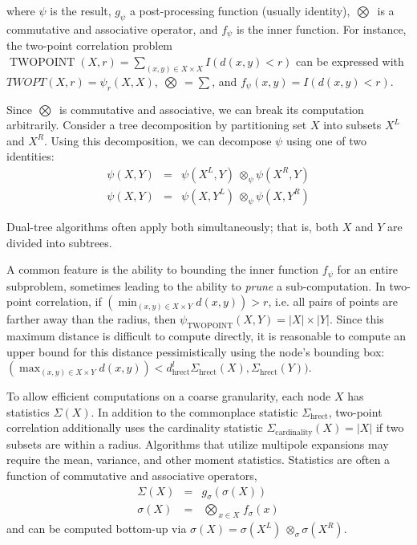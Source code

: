 \documentclass[times, leqno,twocolumn]{article}
\DeclareMathOperator{\TWOPT}{TWOPOINT}
\newcommand{\kdleft}[1]{#1^{\!L}}
\newcommand{\kdright}[1]{#1^{\!R}}
\newcommand{\lo}[1]{#1^{l}}
\newcommand{\distlo}[1]{\lo{d_{\text{hrect}}}}
\newcommand{\myOp}[1]{\mathop{\bigotimes\nolimits\!\!_{#1}}}
\newcommand{\myop}[1]{{\scriptstyle\:}\otimes_{\!#1}}
\newcommand{\letterglob}{\psi}
\newcommand{\inglob}{\psi}
\newcommand{\Opglob}{\myOp{\letterglob}}
\newcommand{\opglob}{\myop{\letterglob}}
\newcommand{\fglob}{f_{\letterglob}}
\newcommand{\gglob}{g_{\letterglob}}
\newcommand{\namestat}[1]{\Sigma_{\text{#1}}}
\newcommand{\outstat}{\Sigma}
\newcommand{\instat}{\sigma}
\newcommand{\Opstat}{\myOp{\instat}}
\newcommand{\opstat}{\myop{\instat}}
\newcommand{\fstat}{f_{\instat}}
\newcommand{\gstat}{g_{\instat}}
\begin{document}
\noindent where $\inglob$ is the result, $\gglob$ a post-processing function (usually identity), $\Opglob$ is a commutative and associative operator, and $\fglob$ is the inner function.
For instance, the two-point correlation problem $\TWOPT(X, r) = \sum_{(x, y) \in X \times X} I(d(x, y) < r)$ can be expressed with $TWOPT(X, r) = \inglob_r(X, X)$, $\Opglob = \sum$, and $\fglob(x, y) = I(d(x, y) < r)$.

Since $\Opglob$ is commutative and associative, we can break its computation arbitrarily.
Consider a tree decomposition by partitioning set $X$ into subsets $\kdleft{X}$ and $\kdright{X}$.
Using this decomposition, we can decompose $\inglob$ using one of two identities:
\begin{eqnarray}
\inglob(X, Y) &=& \inglob(\kdleft{X}, Y) \opglob \inglob(\kdright{X}, Y)
\\
\inglob(X, Y) &=& \inglob(X, \kdleft{Y}) \opglob \inglob(X, \kdright{Y})
\label{eqn:divideglob}
\end{eqnarray}

\noindent Dual-tree algorithms often apply both simultaneously; that is, both $X$ and $Y$ are divided into subtrees.

A common feature is the ability to bounding the inner function $\fglob$ for an entire subproblem, sometimes leading to the ability to {\it prune} a sub-computation.
In two-point correlation, if $\left(\min_{(x, y) \in X \times Y} d(x, y)\right) > r$, i.e. all pairs of points are farther away than the radius, then $\inglob_{\TWOPT}(X, Y) = |X| \times |Y|$.
Since this maximum distance is difficult to compute directly, it is reasonable to compute an upper bound for this distance pessimistically using the node's bounding box: $\left(\max_{(x, y) \in X \times Y} d(x, y)\right) < \distlo(\namestat{hrect}(X), \namestat{hrect}(Y))$.

To allow efficient computations on a coarse granularity, each node $X$ has statistics $\outstat(X)$.
In addition to the commonplace statistic $\namestat{hrect}$, two-point correlation additionally uses the cardinality statistic $\namestat{cardinality}(X) = |X|$ if two subsets are within a radius.
Algorithms that utilize multipole expansions may require the mean, variance, and other moment statistics.
Statistics are often a function of commutative and associative operators,
\begin{eqnarray}
\outstat(X) &=& \gstat(\instat(X))
\\
\instat(X) &=& \Opstat_{x \in X} \fstat(x)
\label{eqn:defstat}
\end{eqnarray}
\noindent and can be computed bottom-up via $\instat(X) = \instat(\kdleft{X}) \opstat \instat(\kdright{X})$.
\end{document}
